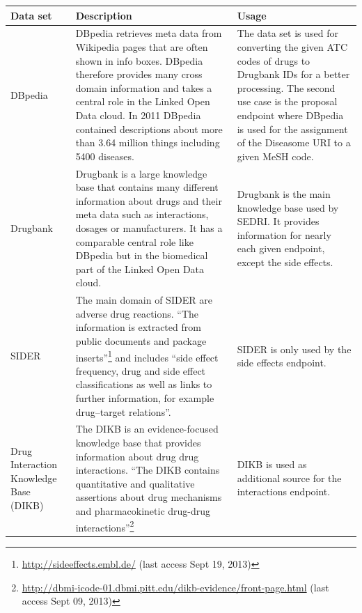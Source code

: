 
\begin{longtable}{p{}|p{}|p{}}
  Data set & Description & Usage\\
  \hline
  DBpedia & DBpedia retrieves meta data from Wikipedia pages that are often shown in info boxes. DBpedia therefore provides many cross domain information and takes a central role in the Linked Open Data cloud. In 2011 DBpedia contained descriptions about more than 3.64 million things including 5400 diseases. & The data set is used for converting the given ATC codes of drugs to Drugbank IDs for a better processing. The second use case is the proposal endpoint where DBpedia is used for the assignment of the Diseasome URI to a given MeSH code.\\
  Drugbank & Drugbank is a large knowledge base that contains many different information about drugs and their meta data such as interactions, dosages or manufacturers. It has a comparable central role like DBpedia but in the biomedical part of the Linked Open Data cloud. & Drugbank is the main knowledge base used by SEDRI. It provides information for nearly each given endpoint, except the side effects.\\
  SIDER & The main domain of SIDER are adverse drug reactions. ``The information is extracted from public documents and package inserts''\footnote{\url{http://sideeffects.embl.de/} (last access Sept 19, 2013)} and includes ``side effect frequency, drug and side effect classifications as well as links to further information, for example drug–target relations''. & SIDER is only used by the side effects endpoint.\\
  Drug Interaction Knowledge Base (DIKB) & The DIKB is an evidence-focused knowledge base that provides information about drug drug interactions. ``The DIKB contains quantitative and qualitative assertions about drug mechanisms and pharmacokinetic drug-drug interactions''\footnote{\url{http://dbmi-icode-01.dbmi.pitt.edu/dikb-evidence/front-page.html} (last access Sept 09, 2013)} & DIKB is used as additional source for the interactions endpoint.\\

\end{longtable}
